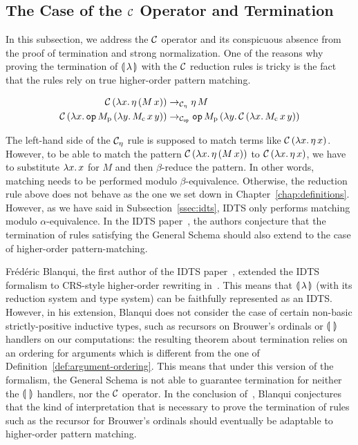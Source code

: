 \subsection{The Case of the $\mathcal{C}$ Operator and Termination}
\label{ssec:c-termination}

In this subsection, we address the $\mathcal{C}$ operator and its conspicuous
absence from the proof of termination and strong normalization. One of the
reasons why proving the termination of ${\llparenthesis \, \lambda \, \rrparenthesis}$ with the $\mathcal{C}$ reduction
rules is tricky is the fact that the rules rely on true higher-order
pattern matching.

\begin{align*}
  \mathcal{C}\,(\lambda x.\, \eta\,(M\,x)) & \to_{\mathcal{C}_\eta} \eta\,M \\
  \mathcal{C}\,(\lambda x.\, \mathtt{op}\,M_{\mathrm{p}}\,(\lambda y.\, M_{\mathrm{c}}\,x\,y))
  & \to_{\mathcal{C}_{\mathtt{op}}} \mathtt{op}\,M_{\mathrm{p}}\,(\lambda y.\, \mathcal{C}\,(\lambda x.\, M_{\mathrm{c}}\,x\,y))
\end{align*}

The left-hand side of the $\mathcal{C}_\eta$ rule is supposed to match terms like
$\mathcal{C}\,(\lambda x.\, \eta\,x)$. However, to be able to match the pattern
$\mathcal{C}\,(\lambda x.\, \eta\,(M\,x))$ to
$\mathcal{C}\,(\lambda x.\, \eta\,x)$, we have to substitute $\lambda x.\, x$ for $M$
and then $\beta$-reduce the pattern. In other words, matching needs to be
performed modulo $\beta$-equivalence. Otherwise, the reduction rule above
does not behave as the one we set down in
Chapter~\ref{chap:definitions}. However, as we have said in
Subsection~\ref{ssec:idts}, IDTS only performs matching modulo
$\alpha$-equivalence. In the IDTS paper~\cite{blanqui2002inductive}, the
authors conjecture that the termination of rules satisfying the General
Schema should also extend to the case of higher-order pattern-matching.

Frédéric Blanqui, the first author of the IDTS
paper~\cite{blanqui2002inductive}, extended the IDTS formalism to CRS-style
higher-order rewriting in~\cite{blanqui2000termination}. This means that
${\llparenthesis \, \lambda \, \rrparenthesis}$ (with its reduction system and type system) can be faithfully
represented as an IDTS. However, in his extension, Blanqui does not
consider the case of certain non-basic strictly-positive inductive types,
such as recursors on Brouwer's ordinals or $\llparenthesis \,  \, \rrparenthesis$ handlers on our
computations: the resulting theorem about termination relies on an ordering
for arguments which is different from the one of
Definition~\ref{def:argument-ordering}. This means that under this version
of the formalism, the General Schema is not able to guarantee termination
for neither the $\llparenthesis \,  \, \rrparenthesis$ handlers, nor the $\mathcal{C}$ operator. In the
conclusion of~\cite{blanqui2000termination}, Blanqui conjectures that the
kind of interpretation that is necessary to prove the termination of rules
such as the recursor for Brouwer's ordinals should eventually be adaptable
to higher-order pattern matching.

